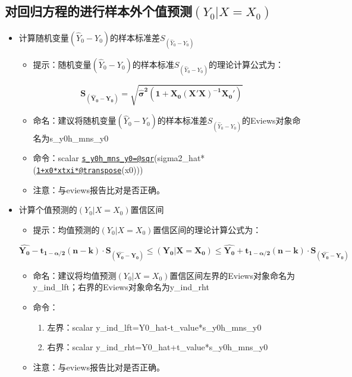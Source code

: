\documentclass[12pt,(landscape,a4paper),(portrait,a4paper)]{article}
\providecommand{\tightlist}{%
  \setlength{\itemsep}{0pt}\setlength{\parskip}{0pt}}
\begin{document}
\hypertarget{y_0xx_0}{%
\subsection{\texorpdfstring{对回归方程的进行样本外个值预测\((Y_0|X=X_0)\)}{对回归方程的进行样本外个值预测(Y\_0\textbar{}X=X\_0)}}\label{y_0xx_0}}

\begin{itemize}
\tightlist
\item
  计算随机变量\({(\hat{Y}_0-Y_0)}\)的样本标准差\(S_{(\hat{Y}_0-Y_0)}\)

  \begin{itemize}
  \tightlist
  \item
    提示：随机变量\({(\hat{Y}_0-Y_0)}\)的样本标准\(S_{(\hat{Y}_0-Y_0)}\)的理论计算公式为：
  \end{itemize}

  \[\mathbf{S_{(\hat{Y}_0-Y_0)}=\sqrt{\hat{\sigma}^2(1+X_0(X'X)^{-1}X_0')}}\]

  \begin{itemize}
  \item
    命名：建议将随机变量\({(\hat{Y}_0-Y_0)}\)的样本标准差\(S_{(\hat{Y}_0-Y_0)}\)的Eviews对象命名为s\_y0h\_mns\_y0
  \item
    命令：scalar
    \href{mailto:s_y0h_mns_y0=@sqr}{\nolinkurl{s\_y0h\_mns\_y0=@sqr}}(sigma2\_hat*(\href{mailto:1+x0*xtxi*@transpose}{\nolinkurl{1+x0*xtxi*@transpose}}(x0)))
  \item
    注意：与eviews报告比对是否正确。
  \end{itemize}
\item
  计算个值预测的\((Y_0|X=X_0)\)置信区间

  \begin{itemize}
  \tightlist
  \item
    提示：均值预测的\((Y_0|X=X_0)\)置信区间的理论计算公式为：
  \end{itemize}

  \[\mathbf{\hat{Y_0}-t_{1-\alpha/2}(n-k)\cdot S_{(\hat{Y_0}-Y_0)}\leq{(Y_0|X=X_0)}\leq \hat{Y_0}+t_{1-\alpha/2}(n-k)\cdot S_{(\hat{Y_0}-Y_0)}} \]

  \begin{itemize}
  \item
    命名：建议将均值预测\((Y_0|X=X_0)\)置信区间左界的Eviews对象命名为y\_ind\_lft；右界的Eviews对象命名为y\_ind\_rht
  \item
    命令：

    \begin{enumerate}
    \def\labelenumi{\alph{enumi}.}
    \tightlist
    \item
      左界：scalar y\_ind\_lft=Y0\_hat-t\_value*s\_y0h\_mns\_y0
    \item
      右界：scalar y\_ind\_rht=Y0\_hat+t\_value*s\_y0h\_mns\_y0
    \end{enumerate}
  \item
    注意：与eviews报告比对是否正确。
  \end{itemize}
\end{itemize}
\end{document}
